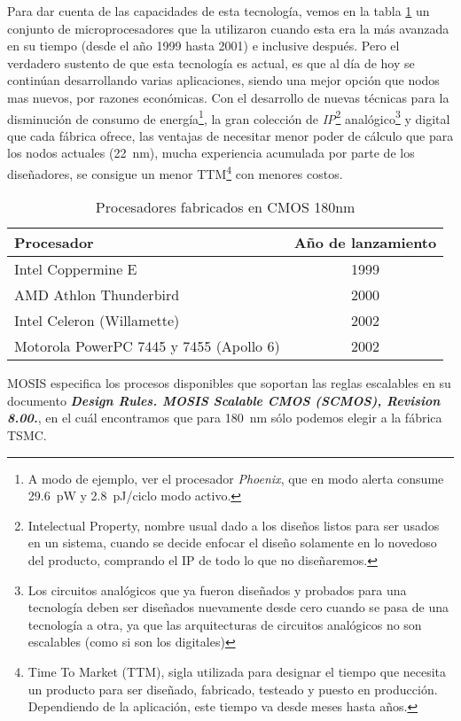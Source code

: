 Para dar cuenta de las capacidades de esta tecnología, vemos en la tabla \ref{cuadro:procesadores180nm} un conjunto de microprocesadores que la utilizaron cuando esta era la más avanzada en su tiempo (desde el año 1999 hasta 2001) e inclusive después. Pero el verdadero sustento de que esta tecnología es actual, es que al día de hoy se continúan desarrollando varias aplicaciones, siendo una mejor opción que nodos mas nuevos, por razones económicas. Con el desarrollo de nuevas técnicas para la disminución de consumo de energía\footnote{A modo de ejemplo, ver el procesador \emph{Phoenix}, que en modo alerta consume 29.6~pW y 2.8~pJ/ciclo modo activo\cite{phoenixP}.}, la gran colección de \emph{IP}\footnote{Intelectual Property, nombre usual dado a los diseños listos para ser usados en un sistema, cuando se decide enfocar el diseño solamente en lo novedoso del producto, comprando el IP de todo lo que no diseñaremos.} analógico\footnote{Los circuitos analógicos que ya fueron diseñados y probados para una tecnología deben ser diseñados nuevamente desde cero cuando se pasa de una tecnología a otra, ya que las arquitecturas de circuitos analógicos no son escalables (como si son los digitales)} y digital que cada fábrica ofrece, las ventajas de necesitar menor poder de cálculo que para los nodos actuales (22~nm), mucha experiencia acumulada por parte de los diseñadores, se consigue un menor TTM\footnote{Time To Market (TTM), sigla utilizada para designar el tiempo que necesita un producto para ser diseñado, fabricado, testeado y puesto en producción. Dependiendo de la aplicación, este tiempo va desde meses hasta años.} con menores costos.


\begin{table}[h]
\centering
\begin{tabular}{@{}lc@{}}
\toprule
Procesador             & Año de lanzamiento \\ \midrule
Intel Coppermine E                & 1999             \\
AMD Athlon Thunderbird      & 2000             \\
Intel Celeron (Willamette)               & 2002            \\
Motorola PowerPC 7445 y 7455 (Apollo 6) & 2002           \\ \bottomrule
\end{tabular}
\caption{Procesadores fabricados en CMOS 180nm }
\label{cuadro:procesadores180nm}
\end{table}

MOSIS especifica los procesos disponibles que soportan las reglas escalables en su documento \emph{\textbf{Design Rules. MOSIS Scalable CMOS (SCMOS), Revision 8.00.}}, en el cuál encontramos que para 180~nm sólo podemos elegir a la fábrica TSMC.

